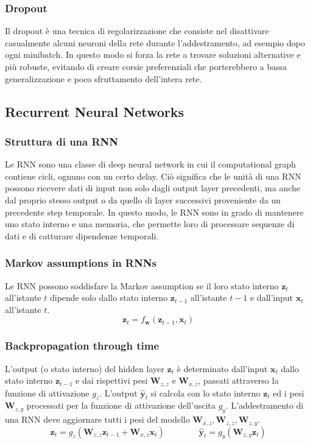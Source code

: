 \subsubsection*{Dropout}
Il dropout è una tecnica di regolarizzazione che consiste nel disattivare casualmente alcuni neuroni della rete durante
l'addestramento, ad esempio dopo ogni minibatch. In questo modo si forza la rete a trovare soluzioni alternative e più
robuste, evitando di creare corsie preferenziali che porterebbero a bassa generalizzazione e poco sfruttamento dell'intera rete.

\subsection{Recurrent Neural Networks}
\subsubsection*{Struttura di una RNN}
Le RNN sono una classe di deep neural network in cui il computational graph contiene cicli, ognuno con un certo delay. Ciò
significa che le unità di una RNN possono ricevere dati di input non solo dagli output layer precedenti, ma anche dal proprio
stesso output o da quello di layer successivi proveniente da un precedente step temporale. In questo modo, le RNN sono in grado
di mantenere uno stato interno e una memoria, che permette loro di processare sequenze di dati e di catturare dipendenze
temporali.

\subsubsection*{Markov assumptions in RNNs}
Le RNN possono soddisfare la Markov assumption se il loro stato interno \(\textbf{z}_t\) all'istante \(t\) dipende solo dallo
stato interno \(\textbf{z}_{t-1}\) all'istante \(t-1\) e dall'input \(\textbf{x}_t\) all'istante \(t\).
\[\textbf{z}_t = f_\textbf{w} (\textbf{z}_{t-1}, \textbf{x}_t)\]

\subsubsection*{Backpropagation through time}
L'output (o stato interno) del hidden layer \(\textbf{z}_t\) è determinato dall'input \(\textbf{x}_t\) dallo stato interno
\(\textbf{z}_{t-1}\) e dai rispettivi pesi \(\textbf{W}_{z,z}\) e \(\textbf{W}_{x,z}\), passati attraverso la funzione di
attivazione \(g_z\). L'output \(\hat{\textbf{y}}_t\) si calcola con lo stato interno \(\textbf{z}_t\) ed i pesi \(\textbf{W}_{z,y}\)
processati per la funzione di attivazione dell'uscita \(g_y\). L'addestramento di una RNN deve aggiornare tutti i pesi
del modello \(\textbf{W}_{x,z}, \textbf{W}_{z,z}, \textbf{W}_{z,y}\).
\[\textbf{z}_t = g_z (\textbf{W}_{z,z} \textbf{z}_{t-1} + \textbf{W}_{x,z} \textbf{x}_t) \qquad\qquad \hat{\textbf{y}}_t = g_y (\textbf{W}_{z,y} \textbf{z}_t)\]


